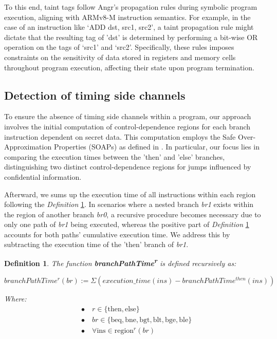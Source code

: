 To this end, taint tags follow Angr's propagation rules during symbolic program execution, aligning with ARMv8-M instruction semantics. For example, in the case of an instruction like ‘ADD dst, src1, src2’, a taint propagation rule might dictate that the resulting tag of 'dst' is determined by performing a bit-wise OR operation on the tags of ‘src1’ and ‘src2’. Specifically, these rules imposes constraints on the sensitivity of data stored in registers and memory cells throughout program execution, affecting their state upon program termination. 

\subsection{Detection of timing side channels}

To ensure the absence of timing side channels within a program, our approach involves the initial computation of control-dependence regions for each branch instruction dependent on secret data. This computation employs the Safe Over-Approximation Properties (SOAPs) as defined in \cite{MantelAVR}. In particular, our focus lies in comparing the execution times between the 'then' and 'else' branches, distinguishing two distinct control-dependence regions for jumps influenced by confidential information.

Afterward, we sums up the execution time of all instructions within each region following the \textit{Definition} \ref{def:timing}. In scenarios where a nested branch \textit{br1} exists within the region of another branch \textit{br0}, a recursive procedure becomes necessary due to only one path of \textit{br1} being executed, whereas the positive part of \textit{Definition} \ref{def:timing} accounts for both paths' cumulative execution time. We address this by subtracting the execution time of the 'then' branch of \textit{br1}.

\newtheorem{definition}{Definition}[section]
\begin{definition}\label{def:timing}
    The function \textbf{branchPathTime\textsuperscript{r}} is defined recursively as: \\
    
   \centerline{$branchPathTime^r(br) := \Sigma (execution\_time(ins) - branchPathTime^{then}(ins))$}

   Where:
\begin{align*}
& \bullet \quad r \in \{ \text{then}, \text{else} \} \\
& \bullet \quad br \in \{ \text{beq}, \text{bne}, \text{bgt}, \text{blt}, \text{bge}, \text{ble} \} \\
& \bullet \quad \forall \text{ins} \in \text{region}^r(br)
\end{align*}

\end{definition}

